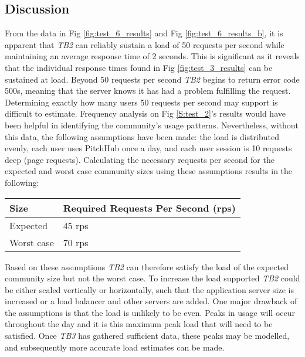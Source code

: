\subsection{Discussion}
From the data in Fig \ref{fig:test_6_results} and Fig \ref{fig:test_6_results_b}, it is apparent that \textit{TB2} can reliably sustain a load of 50 requests per second while maintaining an average response time of 2 seconds. This is significant as it reveals that the individual response times found in Fig \ref{fig:test_3_results} can be sustained at load. Beyond 50 requests per second \textit{TB2} begins to return error code 500s, meaning that the server knows it has had a problem fulfilling the request.
Determining exactly how many users 50 requests per second may support is difficult to estimate. Frequency analysis on Fig \ref{S:test_2}'s results would have been helpful in identifying the community's usage patterns. Nevertheless, without this data, the following assumptions have been made: the load is distributed evenly, each user uses PitchHub once a day, and each user session is 10 requests deep (page requests). Calculating the necessary requests per second for the expected and worst case community sizes using these assumptions results in the following:

\begin {table}[H]
\begin{center}
\begin{tabular}{ |p{2cm}||p{6cm}| }
 \hline
 Size & Required Requests Per Second (rps)\\
 \hline
    Expected & 45 rps\\
 \hline
    Worst case & 70 rps\\
 \hline
\end{tabular}
\end{center}
\end{table}
Based on these assumptions \textit{TB2} can therefore satisfy the load of the expected community size but not the worst case. To increase the load supported \textit{TB2} could be either scaled vertically or horizontally, such that the application server size is increased or a load balancer and other servers are added. 
One major drawback of the assumptions is that the load is unlikely to be even. Peaks in usage will occur throughout the day and it is this maximum peak load that will need to be satisfied. Once \textit{TB3} has gathered sufficient data, these peaks may be modelled, and subsequently more accurate load estimates can be made.
